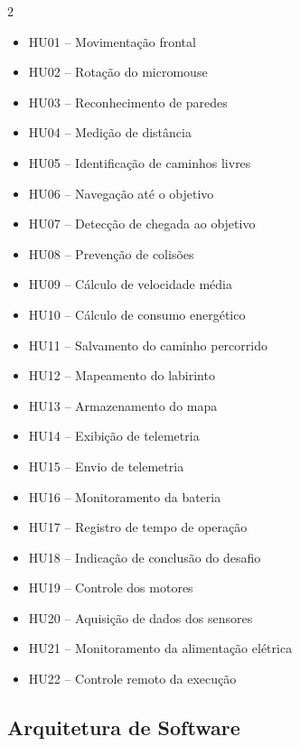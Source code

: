     \begin{center}

    \begin{multicols}{2}
    \begin{itemize}
        \item HU01 -- Movimentação frontal
        \item HU02 -- Rotação do micromouse
        \item HU03 -- Reconhecimento de paredes
        \item HU04 -- Medição de distância
        \item HU05 -- Identificação de caminhos livres
        \item HU06 -- Navegação até o objetivo
        \item HU07 -- Detecção de chegada ao objetivo
        \item HU08 -- Prevenção de colisões
        \item HU09 -- Cálculo de velocidade média
        \item HU10 -- Cálculo de consumo energético
        \item HU11 -- Salvamento do caminho percorrido
        \item HU12 -- Mapeamento do labirinto
        \item HU13 -- Armazenamento do mapa
        \item HU14 -- Exibição de telemetria
        \item HU15 -- Envio de telemetria
        \item HU16 -- Monitoramento da bateria
        \item HU17 -- Registro de tempo de operação
        \item HU18 -- Indicação de conclusão do desafio
        \item HU19 -- Controle dos motores
        \item HU20 -- Aquisição de dados dos sensores
        \item HU21 -- Monitoramento da alimentação elétrica
        \item HU22 -- Controle remoto da execução
    \end{itemize}
    \end{multicols}        
    \end{center}




    \subsection{Arquitetura de Software}

